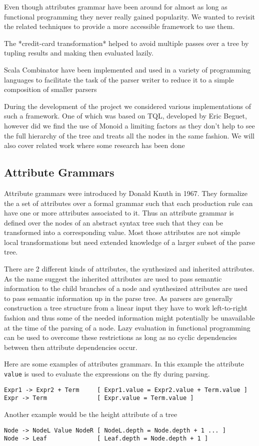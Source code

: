 Even though attributes grammar have been around for almost as long as functional programming they never really gained popularity. We wanted to revisit the related techniques to provide a more accessible framework to use them.

The *credit-card transformation* helped to avoid multiple passes over a tree by tupling results and making then evaluated lazily.

Scala Combinator have been implemented and used in a variety of programming languages to facilitate the task of the parser writer to reduce it to a simple composition of smaller parsers

During the development of the project we considered various implementations of such a framework. One of which was based on TQL, developed by Eric Beguet, however did we find the use of Monoid a limiting factors as they don't help to see the full hierarchy of the tree and treats all the nodes in the same fashion.
We will also cover related work where some research has been done 

\subsection{Attribute Grammars}
Attribute grammars were introduced by Donald Knuth in 1967. They formalize the a set of attributes over a formal grammar such that each production rule can have one or more attributes associated to it. Thus an attribute grammar is defined over the nodes of an abstract syntax tree such that they can be transformed into a corresponding value. Most those attributes are not simple local transformations but need extended knowledge of a larger subset of the parse tree.

There are 2 different kinds of attributes, the synthesized and inherited attributes. As the name suggest the inherited attributes are used to pass semantic information to the child branches of a node and synthesized attributes are used to pass semantic information up in the parse tree. As parsers are generally construction a tree structure from a linear input they have to work left-to-right fashion and thus some of the needed information might potentially be unavailable at the time of the parsing of a node. Lazy evaluation in functional programming can be used to overcome these restrictions as long as no cyclic dependencies between then attribute dependencies occur.

Here are some examples of attributes grammars.
In this example the attribute \verb/value/ is used to evaluate the expressions on the fly during parsing.
\begin{verbatim}
Expr1 -> Expr2 + Term     [ Expr1.value = Expr2.value + Term.value ]
Expr -> Term              [ Expr.value = Term.value ]
\end{verbatim}
Another example would be the height attribute of a tree
\begin{verbatim}
Node -> NodeL Value NodeR [ NodeL.depth = Node.depth + 1 ... ] 
Node -> Leaf              [ Leaf.depth = Node.depth + 1 ]
\end{verbatim}

